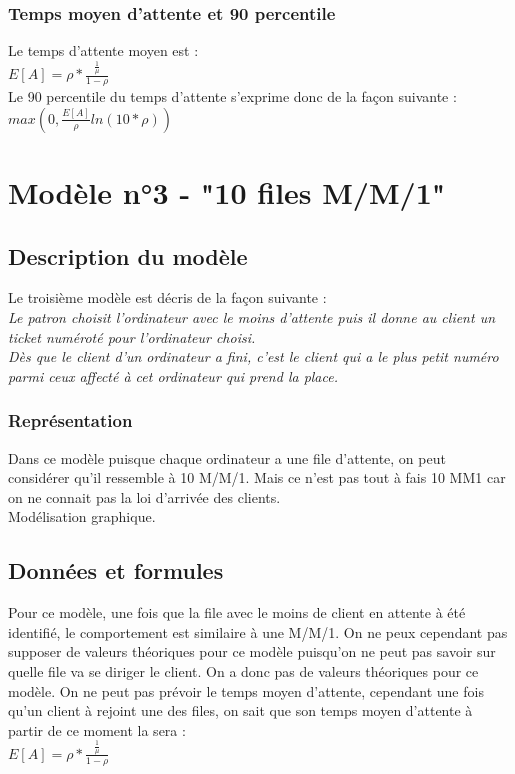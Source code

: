 \documentclass[a4paper,11pt]{article}
\begin{document}
		\subsubsection{Temps moyen d'attente et 90 percentile}
		Le temps d'attente moyen est :\\
		$E[A] = \rho * \frac{\frac{1}{\mu}}{1-\rho}$
		\\
		Le 90 percentile du temps d'attente s'exprime donc de la façon suivante :\\
		$max(0,\frac{E[A]}{\rho}ln(10*\rho))$
		

\section{Modèle n°3 - "10 files M/M/1"}
	\subsection{Description du modèle}
	Le troisième modèle est décris de la façon suivante :\\
	\textit{Le patron choisit l'ordinateur avec le moins d'attente puis il donne au client un ticket numéroté pour l'ordinateur choisi.\\
			Dès que le client d'un ordinateur a fini, c'est le client qui a le plus petit numéro parmi ceux affecté à cet ordinateur qui prend la place.}
	\subsubsection{Représentation}
		Dans ce modèle puisque chaque ordinateur a une file d'attente, on peut considérer qu'il ressemble à 10 M/M/1.
		Mais ce n'est pas tout à fais 10 MM1 car on ne connait pas la loi d'arrivée des clients.\\
		

	Modélisation graphique.\\
	
	\subsection{Données et formules}
	Pour ce modèle, une fois que la file avec le moins de client en attente à été identifié, le comportement est similaire à une M/M/1. On ne peux cependant pas supposer de valeurs théoriques pour ce modèle puisqu'on ne peut pas savoir sur quelle file va se diriger le client. On a donc pas de valeurs théoriques pour ce modèle.
	On ne peut pas prévoir le temps moyen d'attente, cependant une fois qu'un client à rejoint une des files, on sait que son temps moyen d'attente à partir de ce moment la sera : \\
	$E[A] = \rho * \frac{\frac{1}{\mu}}{1-\rho}$
	\\
\end{document}
